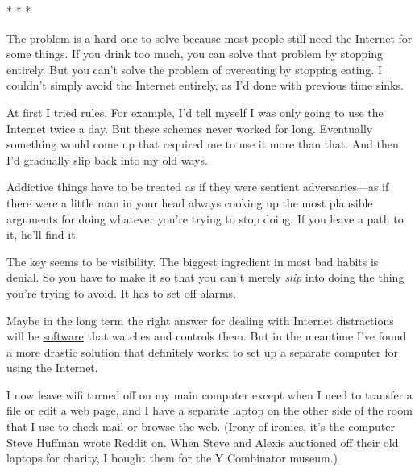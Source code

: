                   * * *
                  

The problem is a hard one to solve because most
                  people still need the Internet for some things. If you drink
                  too much, you can solve that problem by stopping entirely. But
                  you can't solve the problem of overeating by stopping eating.
                  I couldn't simply avoid the Internet entirely, as I'd done
                  with previous time sinks.

At first I tried rules.
                  For example, I'd tell myself I was only going to use the
                  Internet twice a day. But these schemes never worked for long.
                  Eventually something would come up that required me to use it
                  more than that. And then I'd gradually slip back into my old
                  ways.

Addictive things have to be treated as if
                  they were sentient adversaries---as if there were a little
                  man in your head always cooking up the most plausible
                  arguments for doing whatever you're trying to stop doing. If
                  you leave a path to it, he'll find it.

The key
                  seems to be visibility. The biggest ingredient in most bad
                  habits is denial. So you have to make it so that you can't
                  merely \emph{slip} into doing the thing you're trying to
                  avoid. It has to set off alarms.

Maybe in the long
                  term the right answer for dealing with Internet distractions
                  will be \href{http://rescuetime.com}{software} that
                  watches and controls them. But in the meantime I've found a
                  more drastic solution that definitely works: to set up a
                  separate computer for using the Internet.

I now
                  leave wifi turned off on my main computer except when I need
                  to transfer a file or edit a web page, and I have a separate
                  laptop on the other side of the room that I use to check mail
                  or browse the web. (Irony of ironies, it's the computer Steve
                  Huffman wrote Reddit on. When Steve and Alexis auctioned off
                  their old laptops for charity, I bought them for the Y
                  Combinator museum.)

